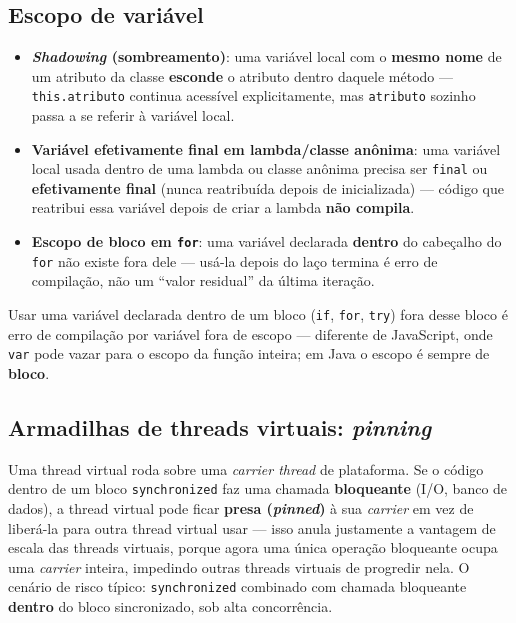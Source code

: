 \subsection{Escopo de variável}

\begin{conceito}
\begin{itemize}
\item \textbf{\textit{Shadowing} (sombreamento)}: uma variável local com o
\textbf{mesmo nome} de um atributo da classe \textbf{esconde} o atributo
dentro daquele método --- \texttt{this.atributo} continua acessível
explicitamente, mas \texttt{atributo} sozinho passa a se referir à
variável local.
\item \textbf{Variável efetivamente final em lambda/classe anônima}: uma
variável local usada dentro de uma lambda ou classe anônima precisa ser
\texttt{final} ou \textbf{efetivamente final} (nunca reatribuída depois
de inicializada) --- código que reatribui essa variável depois de criar a
lambda \textbf{não compila}.
\item \textbf{Escopo de bloco em \texttt{for}}: uma variável declarada
\textbf{dentro} do cabeçalho do \texttt{for} não existe fora dele ---
usá-la depois do laço termina é erro de compilação, não um “valor
residual” da última iteração.
\end{itemize}
\end{conceito}

\begin{cuidado}
Usar uma variável declarada dentro de um bloco (\texttt{if},
\texttt{for}, \texttt{try}) fora desse bloco é erro de compilação por
variável fora de escopo --- diferente de JavaScript, onde \texttt{var}
pode vazar para o escopo da função inteira; em Java o escopo é sempre de
\textbf{bloco}.
\end{cuidado}

\subsection{Armadilhas de threads virtuais: \textit{pinning}}

\begin{conceito}
Uma thread virtual roda sobre uma \textit{carrier thread} de plataforma.
Se o código dentro de um bloco \texttt{synchronized} faz uma chamada
\textbf{bloqueante} (I/O, banco de dados), a thread virtual pode ficar
\textbf{presa (\textit{pinned})} à sua \textit{carrier} em vez de
liberá-la para outra thread virtual usar --- isso anula justamente a
vantagem de escala das threads virtuais, porque agora uma única operação
bloqueante ocupa uma \textit{carrier} inteira, impedindo outras threads
virtuais de progredir nela. O cenário de risco típico:
\texttt{synchronized} combinado com chamada bloqueante \textbf{dentro} do
bloco sincronizado, sob alta concorrência.
\end{conceito}


